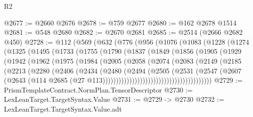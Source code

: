 \begin{lexlean}{R2}
\begin{coremodule}
@2677 := @2660 @2676
@2678 := @759 @2677
@2680 := @162 @2678 @1514
@2681 := @548 @2680
@2682 := @2670 @2681
@2685 := @2514 (@2666 @2682 @450)
@2728 := @112
    (@569
      (@632
        (@776
          (@956
            (@1076
              (@1083
                (@1228
                  (@1274
                    (@1325
                      (@1495
                        (@1733
                          (@1755
                            (@1790
                              (@1837
                                (@1849
                                  (@1856
                                    (@1905
                                      (@1929
                                        (@1942
                                          (@1962
                                            (@1975
                                              (@1984
                                                (@2005
                                                  (@2058
                                                    (@2074
                                                      (@2083
                                                        (@2149
                                                          (@2185
                                                            (@2213
                                                              (@2280
                                                                (@2406
                                                                  (@2434
                                                                    (@2480
                                                                      (@2494
                                                                        (@2505
                                                                          (@2531
                                                                            (@2547
                                                                              (@2607
                                                                                (@2643
                                                                                  (@114
                                                                                    @2685
                                                                                    (@27
                                                                                      @113)))))))))))))))))))))))))))))))))))))))))
@2729 := PrismTemplateContract.NormPlan.TensorDescriptor
@2730 := LexLeanTarget.TargetSyntax.Value
@2731 := @2729 -> @2730
@2732 := LexLeanTarget.TargetSyntax.Value.adt

\end{coremodule}
\end{lexlean}
